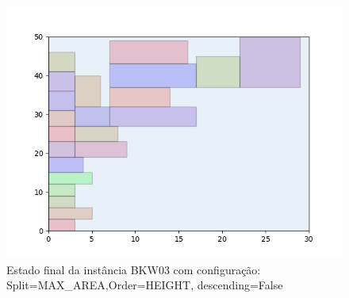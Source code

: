 \begin{figure}[H]
    \centering
    \caption[]{Estado final da instância BKW03 com configuração: Split=MAX_AREA,Order=HEIGHT, descending=False}
    \label{fig:bkw03-max_area-height-false}
    \includegraphics[scale=0.5]{output/figures/bkw/bkw03/max_area/height/false/00}
\end{figure}